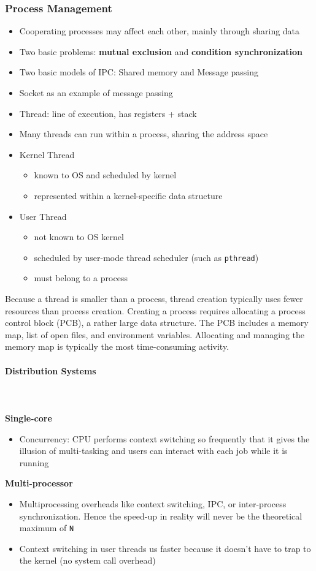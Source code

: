 \documentclass[a4paper]{article}
\begin{document}
\subsubsection{Process Management}
\begin{itemize}
	\item Cooperating processes may affect each other, mainly through sharing data
	\item Two basic problems: \textbf{mutual exclusion} and \textbf{condition synchronization}
	\item Two basic models of IPC: Shared memory and Message passing
	\item Socket as an example of message passing
	\item Thread: line of execution, has registers + stack
	\item Many threads can run within a process, sharing the address space
	\item Kernel Thread
	\begin{itemize}[label=$\circ$]
		\item known to OS and scheduled by kernel
		\item represented within a kernel-specific data structure
	\end{itemize}
	\item User Thread
	\begin{itemize}[label=$\circ$]
		\item not known to OS kernel
		\item scheduled by user-mode thread scheduler (such as \texttt{pthread})
		\item must belong to a process
	\end{itemize}
\end{itemize}
Because a thread is smaller than a process, thread creation typically uses fewer resources than process creation. Creating a process requires allocating a process control block (PCB), a rather large data structure. The PCB includes a memory map, list of open files, and environment variables. Allocating and managing the memory map is typically the most time-consuming activity.
\paragraph{Distribution Systems}\mbox{}\\
\\
\textbf{Single-core}
\begin{itemize}
	\item Concurrency: CPU performs context switching so frequently that it gives the illusion of multi-tasking and users can interact with each job while it is running
\end{itemize}
\noindent \textbf{Multi-processor}
\begin{itemize}
	\item Multiprocessing overheads like context switching, IPC, or inter-process synchronization. Hence the speed-up in reality will never be the theoretical maximum of \texttt{N}
	\item Context switching in user threads us faster because it doesn’t have to trap to the kernel (no system call overhead)
\end{itemize}
\end{document}
